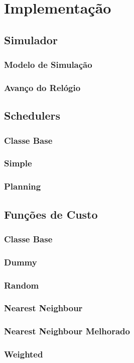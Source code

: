 \chapter{\label{chap:impl}Implementação}

\section{Simulador}
\subsection{Modelo de Simulação}
\subsection{Avanço do Relógio}

\section{Schedulers}
\subsection{Classe Base}
\subsection{Simple}
\subsection{Planning}

\section{Funções de Custo}
\subsection{Classe Base}
\subsection{Dummy}
\subsection{Random}
\subsection{Nearest Neighbour}
\subsection{Nearest Neighbour Melhorado}
\subsection{Weighted}